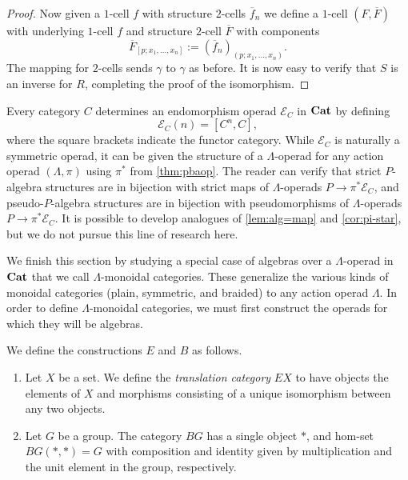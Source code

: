 \begin{proof}
Now given a $1$-cell $f$ with structure $2$-cells $\overline{f}_n$ we define a $1$-cell $(F,\overline{F})$ with underlying $1$-cell $f$ and structure $2$-cell $\overline{F}$ with components
    \[
        \overline{F}_{[p;x_1, \ldots, x_n]} := \left(\overline{f}_{n}\right)_{(p;x_1,\ldots,x_n)}.
    \]
The mapping for $2$-cells sends $\gamma$ to $\gamma$ as before. 
It is now easy to verify that $S$ is an inverse for $R$, completing the proof of the isomorphism.
\end{proof}

\begin{rem}\label{rem:lop-alg-E}
Every category $C$ determines an endomorphism operad $\mathcal{E}_C$ in $\mathbf{Cat}$ by defining
\[
\mathcal{E}_C(n) = [C^n, C],
\]
where the square brackets indicate the functor category.
While $\mathcal{E}_C$ is naturally a symmetric operad, it can be given the structure of a $\Lambda$-operad for any action operad $(\Lambda, \pi)$ using $\pi^*$ from \cref{thm:pbaop}.
The reader can verify that strict $P$-algebra structures are in bijection with strict maps of $\Lambda$-operads $P \to \pi^*\mathcal{E}_C$, and pseudo-$P$-algebra structures are in bijection with pseudomorphisms of $\Lambda$-operads $P \to \pi^*\mathcal{E}_C$.
It is possible to develop analogues of \cref{lem:alg=map} and \cref{cor:pi-star}, but we do not pursue this line of research here.
\end{rem}

We finish this section by studying a special case of algebras over a $\Lambda$-operad in $\mathbf{Cat}$ that we call $\Lambda$-monoidal categories.
These generalize the various kinds of monoidal categories (plain, symmetric, and braided) to any action operad $\Lambda$.
In order to define $\Lambda$-monoidal categories, we must first construct the operads for which they will be algebras.

\begin{Defi}[($E$ and $B$)]\label{Defi:e_b}
We define the constructions $E$ and $B$ as follows.
  \begin{enumerate}
    \item Let $X$ be a set. We define the \textit{translation category} $EX$ to have objects the elements of $X$ and morphisms consisting of a unique isomorphism between any two objects.
    \item Let $G$ be a group. The category $BG$ has a single object $*$, and hom-set $BG(*,*) = G$ with composition and identity given by multiplication and the unit element in the group, respectively.
  \end{enumerate}
\end{Defi}

